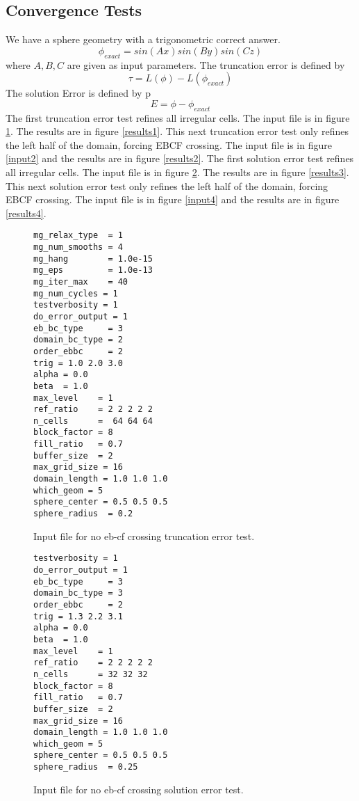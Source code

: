 \subsection{Convergence Tests}
We have a sphere geometry with a trigonometric correct answer.   
$$
\phi_{exact} = sin(Ax) sin(By) sin(Cz)
$$
where $A, B, C$ are given as  input parameters.
The truncation error is defined by
$$
\tau = L(\phi) - L(\phi_{exact})
$$
The solution Error is defined by p
$$
E = \phi - \phi_{exact}
$$
The first truncation error test refines all irregular cells.
The input file is in figure \ref{input1}.  The results are in figure \ref{results1}.
This next truncation error test only refines the left half of the domain, forcing EBCF
crossing.  The input file is in figure \ref{input2}  and the results
are in figure \ref{results2}.
The first solution error test refines all irregular cells.
The input file is in figure \ref{input3}.  The results are in figure \ref{results3}.
This next solution error test only refines the left half of the domain, forcing EBCF
crossing.  The input file is in figure \ref{input4}  and the results
are in figure \ref{results4}.

\begin{figure}
\begin{tiny}
\begin{verbatim}
mg_relax_type  = 1
mg_num_smooths = 4
mg_hang        = 1.0e-15
mg_eps         = 1.0e-13
mg_iter_max    = 40
mg_num_cycles = 1
testverbosity = 1
do_error_output = 1
eb_bc_type     = 3
domain_bc_type = 2
order_ebbc     = 2
trig = 1.0 2.0 3.0
alpha = 0.0
beta  = 1.0
max_level    = 1
ref_ratio    = 2 2 2 2 2 
n_cells      =  64 64 64
block_factor = 8
fill_ratio   = 0.7
buffer_size  = 2
max_grid_size = 16
domain_length = 1.0 1.0 1.0
which_geom = 5
sphere_center = 0.5 0.5 0.5
sphere_radius  = 0.2	
\end{verbatim}
\end{tiny}
\caption{Input file for no eb-cf crossing truncation error test.}
\label{input1}
\end{figure}

\begin{figure}
\begin{tiny}
\begin{verbatim}
testverbosity = 1
do_error_output = 1
eb_bc_type     = 3
domain_bc_type = 3
order_ebbc     = 2
trig = 1.3 2.2 3.1
alpha = 0.0
beta  = 1.0
max_level    = 1
ref_ratio    = 2 2 2 2 2 
n_cells      = 32 32 32
block_factor = 8
fill_ratio   = 0.7
buffer_size  = 2
max_grid_size = 16
domain_length = 1.0 1.0 1.0
which_geom = 5
sphere_center = 0.5 0.5 0.5
sphere_radius  = 0.25	
\end{verbatim}
\end{tiny}
\caption{Input file for no eb-cf crossing solution error test.}
\label{input3}
\end{figure}


